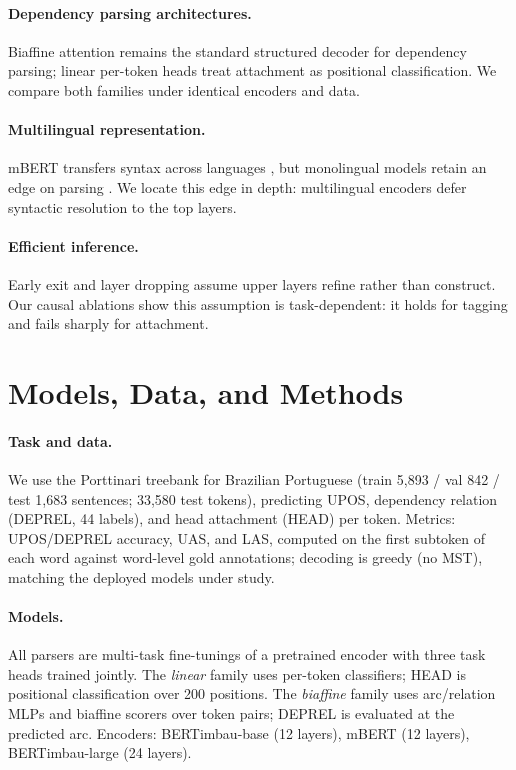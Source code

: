 \documentclass[letterpaper]{article}
\begin{document}
\paragraph{Dependency parsing architectures.}
Biaffine attention \cite{dozat2017biaffine} remains the standard structured
decoder for dependency parsing; linear per-token heads treat attachment as
positional classification. We compare both families under identical encoders
and data.

\paragraph{Multilingual representation.}
mBERT transfers syntax across languages \cite{pires2019multilingual}, but
monolingual models retain an edge on parsing
\cite{souza2020bertimbau,conneau2020unsupervised}. We locate this edge in
depth: multilingual encoders defer syntactic resolution to the top layers.

\paragraph{Efficient inference.}
Early exit and layer dropping \cite{xin2020deebert,fan2020layerdrop} assume
upper layers refine rather than construct. Our causal ablations show this
assumption is task-dependent: it holds for tagging and fails sharply for
attachment.

\section{Models, Data, and Methods}

\paragraph{Task and data.}
We use the Porttinari treebank for Brazilian Portuguese \cite{porttinari2023}
(train 5{,}893 / val 842 / test 1{,}683 sentences; 33{,}580 test tokens),
predicting UPOS, dependency relation (DEPREL, 44 labels), and head attachment
(HEAD) per token. Metrics: UPOS/DEPREL accuracy, UAS, and LAS, computed on the
first subtoken of each word against word-level gold annotations; decoding is
greedy (no MST), matching the deployed models under study.

\paragraph{Models.}
All parsers are multi-task fine-tunings of a pretrained encoder with three
task heads trained jointly. The \emph{linear} family uses per-token
classifiers; HEAD is positional classification over 200 positions. The
\emph{biaffine} family \cite{dozat2017biaffine} uses arc/relation MLPs and
biaffine scorers over token pairs; DEPREL is evaluated at the predicted arc.
Encoders: BERTimbau-base (12 layers), mBERT (12 layers), BERTimbau-large (24
layers).
\end{document}
